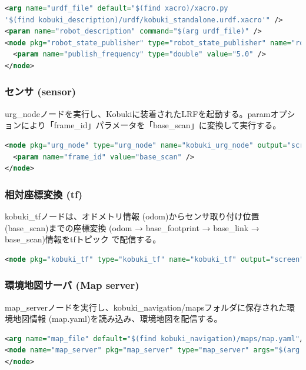 \begin{lstlisting}[language=XML]
<arg name="urdf_file" default="$(find xacro)/xacro.py
'$(find kobuki_description)/urdf/kobuki_standalone.urdf.xacro'" />
<param name="robot_description" command="$(arg urdf_file)" />
<node pkg="robot_state_publisher" type="robot_state_publisher" name="robot_state_publisher" output="screen">
  <param name="publish_frequency" type="double" value="5.0" />
</node>
\end{lstlisting}

\subsubsection{センサ (sensor)}

urg\_nodeノードを実行し、Kobukiに装着されたLRFを起動する。paramオプションにより「frame\_id」パラメータを「base\_scan」に変換して実行する。

\begin{lstlisting}[language=XML]
<node pkg="urg_node" type="urg_node" name="kobuki_urg_node" output="screen">
  <param name="frame_id" value="base_scan" />
</node>
\end{lstlisting}

\subsubsection{相対座標変換 (tf)}
kobuki\_tfノードは、オドメトリ情報 (odom)からセンサ取り付け位置 (base\_scan)までの座標変換 (odom → base\_footprint → base\_link → base\_scan)情報をtfトピック  で配信する。

\begin{lstlisting}[language=XML]
<node pkg="kobuki_tf" type="kobuki_tf" name="kobuki_tf" output="screen"> </node>
\end{lstlisting}

\subsubsection{環境地図サーバ (Map server)}
map\_serverノードを実行し、kobuki\_navigation/mapsフォルダに保存された環境地図情報 (map.yaml)を読み込み、環境地図を配信する。

\begin{lstlisting}[language=XML]
<arg name="map_file" default="$(find kobuki_navigation)/maps/map.yaml"/>
<node name="map_server" pkg="map_server" type="map_server" args="$(arg map_file)">
</node>
\end{lstlisting}


